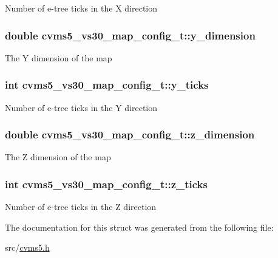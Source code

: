Number of e-\/tree ticks in the X direction \hypertarget{structcvms5__vs30__map__config__t_a703b4375d99324443cc34ea43542bdbd}{
\subsubsection[{y\+\_\+dimension}]{\setlength{\rightskip}{0pt plus 5cm}double cvms5\+\_\+vs30\+\_\+map\+\_\+config\+\_\+t\+::y\+\_\+dimension}}\label{structcvms5__vs30__map__config__t_a703b4375d99324443cc34ea43542bdbd}
The Y dimension of the map \hypertarget{structcvms5__vs30__map__config__t_af7c4e61944fdbe7d6c7b0e53a71666e4}{
\subsubsection[{y\+\_\+ticks}]{\setlength{\rightskip}{0pt plus 5cm}int cvms5\+\_\+vs30\+\_\+map\+\_\+config\+\_\+t\+::y\+\_\+ticks}}\label{structcvms5__vs30__map__config__t_af7c4e61944fdbe7d6c7b0e53a71666e4}
Number of e-\/tree ticks in the Y direction \hypertarget{structcvms5__vs30__map__config__t_a1059fa7688dde557cad355af30910b8d}{
\subsubsection[{z\+\_\+dimension}]{\setlength{\rightskip}{0pt plus 5cm}double cvms5\+\_\+vs30\+\_\+map\+\_\+config\+\_\+t\+::z\+\_\+dimension}}\label{structcvms5__vs30__map__config__t_a1059fa7688dde557cad355af30910b8d}
The Z dimension of the map \hypertarget{structcvms5__vs30__map__config__t_af3bd0d454632e4b06041be797f400334}{
\subsubsection[{z\+\_\+ticks}]{\setlength{\rightskip}{0pt plus 5cm}int cvms5\+\_\+vs30\+\_\+map\+\_\+config\+\_\+t\+::z\+\_\+ticks}}\label{structcvms5__vs30__map__config__t_af3bd0d454632e4b06041be797f400334}
Number of e-\/tree ticks in the Z direction 

The documentation for this struct was generated from the following file\+:\begin{DoxyCompactItemize}
\item 
src/\hyperlink{cvms5_8h}{cvms5.\+h}\end{DoxyCompactItemize}
